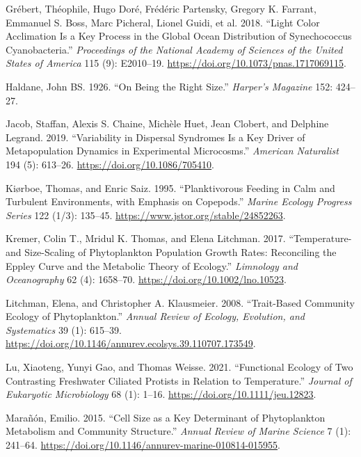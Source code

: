 \documentclass[
  letterpaper,
  DIV=11,
  numbers=noendperiod]{scrartcl}
\begin{document}
\begin{CSLReferences}
Grébert, Théophile, Hugo Doré, Frédéric Partensky, Gregory K. Farrant,
Emmanuel S. Boss, Marc Picheral, Lionel Guidi, et al. 2018. {``Light
Color Acclimation Is a Key Process in the Global Ocean Distribution of
{Synechococcus} Cyanobacteria.''} \emph{Proceedings of the National
Academy of Sciences of the United States of America} 115 (9): E2010--19.
\url{https://doi.org/10.1073/pnas.1717069115}.

Haldane, John BS. 1926. {``On Being the Right Size.''} \emph{Harper's
Magazine} 152: 424--27.

Jacob, Staffan, Alexis S. Chaine, Michèle Huet, Jean Clobert, and
Delphine Legrand. 2019. {``Variability in Dispersal Syndromes Is a Key
Driver of Metapopulation Dynamics in Experimental Microcosms.''}
\emph{American Naturalist} 194 (5): 613--26.
\url{https://doi.org/10.1086/705410}.

Kiørboe, Thomas, and Enric Saiz. 1995. {``Planktivorous Feeding in Calm
and Turbulent Environments, with Emphasis on Copepods.''} \emph{Marine
Ecology Progress Series} 122 (1/3): 135--45.
\url{https://www.jstor.org/stable/24852263}.

Kremer, Colin T., Mridul K. Thomas, and Elena Litchman. 2017.
{``Temperature- and Size-Scaling of Phytoplankton Population Growth
Rates: {Reconciling} the {Eppley} Curve and the Metabolic Theory of
Ecology.''} \emph{Limnology and Oceanography} 62 (4): 1658--70.
\url{https://doi.org/10.1002/lno.10523}.

Litchman, Elena, and Christopher A. Klausmeier. 2008. {``Trait-{Based
Community Ecology} of {Phytoplankton}.''} \emph{Annual Review of
Ecology, Evolution, and Systematics} 39 (1): 615--39.
\url{https://doi.org/10.1146/annurev.ecolsys.39.110707.173549}.

Lu, Xiaoteng, Yunyi Gao, and Thomas Weisse. 2021. {``Functional Ecology
of Two Contrasting Freshwater Ciliated Protists in Relation to
Temperature.''} \emph{Journal of Eukaryotic Microbiology} 68 (1): 1--16.
\url{https://doi.org/10.1111/jeu.12823}.

Marañón, Emilio. 2015. {``Cell {Size} as a {Key Determinant} of
{Phytoplankton Metabolism} and {Community Structure}.''} \emph{Annual
Review of Marine Science} 7 (1): 241--64.
\url{https://doi.org/10.1146/annurev-marine-010814-015955}.


\end{CSLReferences}
\end{document}
